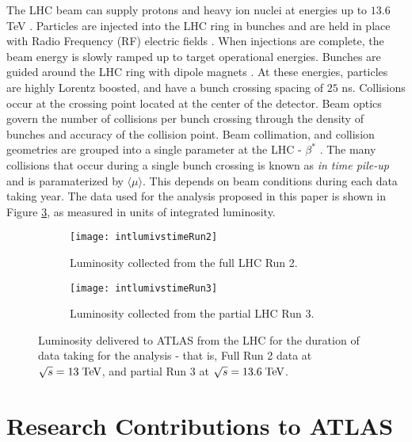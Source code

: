 \documentclass[12pt]{article}
\begin{document}
The LHC beam can supply protons and heavy ion nuclei at energies up to $13.6$
TeV \cite{Aad_2024}. Particles are injected into the LHC ring in bunches and are
held in place with Radio Frequency (RF) electric fields
\cite{bunch_filling_schemes_bailey}. When injections are complete, the beam
energy is slowly ramped up to target operational energies. Bunches are guided
around the LHC ring with dipole magnets \cite{The_ATLAS_Collaboration_2008,
bunch_filling_schemes_bailey}. At these energies, particles are highly Lorentz
boosted, and have a bunch crossing spacing of $25$ ns. Collisions occur at the
crossing point located at the center of the detector. Beam optics govern the
number of collisions per bunch crossing through the density of bunches and
accuracy of the collision point. Beam collimation, and collision geometries are
grouped into a single parameter at the LHC - $\beta^*$ \cite{Aad_2024}. The many
collisions that occur during a single bunch crossing is known as \textit{in time
pile-up} and is paramaterized by $\langle\mu\rangle$. This depends on beam
conditions during each data taking year. The data used for the analysis proposed
in this paper is shown in Figure \ref{fig:lhc_luminosity}, as measured in units
of integrated luminosity.

\begin{figure}[t!]
    \centering
    \begin{subfigure}[t]{.48\textwidth}
        \centering
        \texttt{[image: intlumivstimeRun2]}
        \caption{Luminosity collected from the full LHC Run 2.}
        \label{subfig:lumi_run2}
    \end{subfigure}
    \hfill
    \begin{subfigure}[t]{.48\textwidth}
        \centering
        \texttt{[image: intlumivstimeRun3]}
        \caption{Luminosity collected from the partial LHC Run 3.}
        \label{subfig:lumi_run3}
    \end{subfigure}
\caption{Luminosity delivered to ATLAS from the LHC for the duration of data
taking for the analysis - that is, Full Run 2 data at $\sqrt{s}=13\;\text{TeV}$, and
partial Run 3 at $\sqrt{s}=13.6\;\text{TeV}$.} %
\label{fig:lhc_luminosity}
\end{figure}

\section{Research Contributions to ATLAS}
\end{document}
